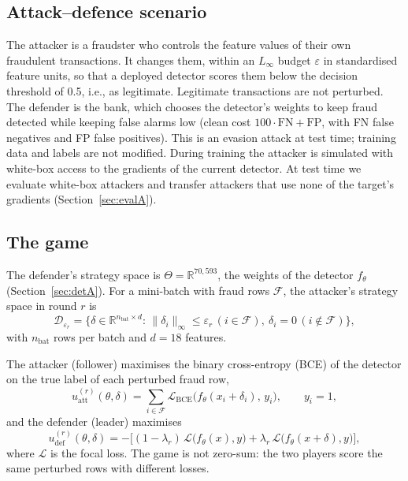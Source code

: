\documentclass[conference]{IEEEtran}
\newcommand{\cL}{\mathcal{L}}
\begin{document}
\subsection{Attack--defence scenario}\label{sec:threatA}
The attacker is a fraudster who controls the feature values of their own fraudulent transactions. It changes them, within an $L_\infty$ budget $\varepsilon$ in standardised feature units, so that a deployed detector scores them below the decision threshold of 0.5, i.e., as legitimate. Legitimate transactions are not perturbed. The defender is the bank, which chooses the detector's weights to keep fraud detected while keeping false alarms low (clean cost $100\cdot\mathrm{FN}+\mathrm{FP}$, with FN false negatives and FP false positives). This is an evasion attack at test time; training data and labels are not modified. During training the attacker is simulated with white-box access to the gradients of the current detector. At test time we evaluate white-box attackers and transfer attackers that use none of the target's gradients (Section~\ref{sec:evalA}).

\subsection{The game}\label{sec:payoffA}
The defender's strategy space is $\Theta=\mathbb R^{70{,}593}$, the weights of the detector $f_\theta$ (Section~\ref{sec:detA}). For a mini-batch with fraud rows $\mathcal F$, the attacker's strategy space in round $r$ is
\begin{equation}
\mathcal D_{\varepsilon_r}=\big\{\delta\in\mathbb R^{n_{\mathrm{bat}}\times d}\!:\, \|\delta_i\|_\infty\le\varepsilon_r\,(i\in\mathcal F),\ \delta_i=0\,(i\notin\mathcal F)\big\},
\label{eq:DA}
\end{equation}
with $n_{\mathrm{bat}}$ rows per batch and $d=18$ features.

The attacker (follower) maximises the binary cross-entropy (BCE) of the detector on the true label of each perturbed fraud row,
\begin{equation}
u^{(r)}_{\mathrm{att}}(\theta,\delta)=\sum_{i\in\mathcal F}\cL_{\mathrm{BCE}}\big(f_\theta(x_i+\delta_i),\,y_i\big),\qquad y_i=1,
\label{eq:uatt}
\end{equation}
and the defender (leader) maximises
\begin{equation}
u^{(r)}_{\mathrm{def}}(\theta,\delta)=-\big[(1-\lambda_r)\,\cL\big(f_\theta(x),y\big)+\lambda_r\,\cL\big(f_\theta(x+\delta),y\big)\big],
\label{eq:defobj}
\end{equation}
where $\cL$ is the focal loss. The game is not zero-sum: the two players score the same perturbed rows with different losses.
\end{document}
